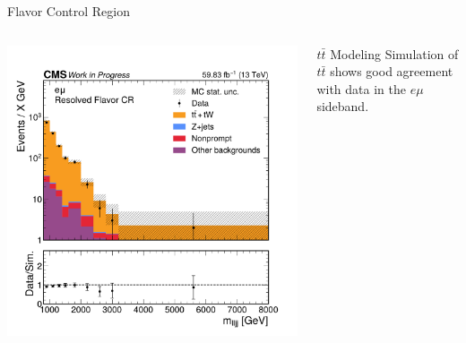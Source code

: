 \documentclass[aspectratio=169]{beamer}
\begin{document}
\begin{frame}{Flavor Control Region}
  \begin{columns}
    \begin{column}{0.50\textwidth}
      \centering
      \includegraphics[width=\textwidth]{../figures/plots/mass-fourobject-flavorcr.pdf}
    \end{column}
    \begin{column}{0.50\textwidth}
        \vspace*{-15mm}
        \centering
        \resizebox{\columnwidth}{!}{%
        }
      \vspace{1ex} 
      \begin{block}{$t\bar{t}$ Modeling}
        Simulation of $t\bar{t}$ shows good agreement with data in the $e\mu$ sideband.
      \end{block}
    \end{column}
  \end{columns}
\end{frame}
\end{document}

